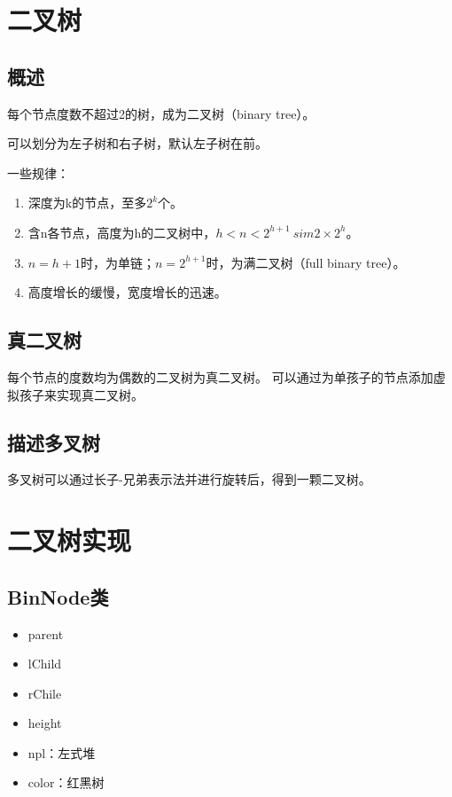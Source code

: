 \documentclass{article}
\begin{document}
\section{二叉树}
\subsection{概述}

每个节点度数不超过2的树，成为二叉树（binary tree）。

可以划分为左子树和右子树，默认左子树在前。

一些规律：
\begin{enumerate}
  \item 深度为k的节点，至多$2^k$个。
  \item 含n各节点，高度为h的二叉树中，$h<n<2^{h+1} \ sim 2 \times 2^h$。
  \item $n=h+1$时，为单链；$n=2^{h+1}$时，为满二叉树（full binary tree）。
  \item 高度增长的缓慢，宽度增长的迅速。
\end{enumerate}

\subsection{真二叉树}

每个节点的度数均为偶数的二叉树为真二叉树。
可以通过为单孩子的节点添加虚拟孩子来实现真二叉树。

\subsection{描述多叉树}

多叉树可以通过长子-兄弟表示法并进行旋转后，得到一颗二叉树。

\section{二叉树实现}
\subsection{BinNode类}
\begin{itemize}
  \item parent
  \item lChild
  \item rChile
  \item height
  \item npl：左式堆
  \item color：红黑树
\end{itemize}
\end{document}
